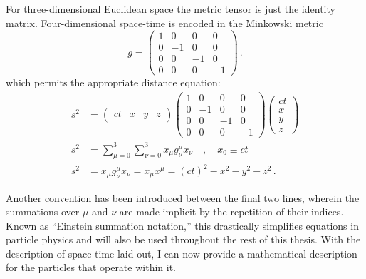     For three-dimensional Euclidean space the metric tensor is just the identity matrix.
    Four-dimensional space-time is encoded in the Minkowski metric
    \begin{equation}
        g = \begin{pmatrix}
            1 &  0 &  0 &  0 \\
            0 & -1 &  0 &  0 \\
            0 &  0 & -1 &  0 \\
            0 &  0 &  0 & -1
        \end{pmatrix}
        \,.
    \end{equation}
    which permits the appropriate distance equation:
    \begin{equation} \begin{split}
        s^2 &= \begin{pmatrix} ct & x & y & z\end{pmatrix} 
            \begin{pmatrix}
                1 &  0 &  0 &  0 \\
                0 & -1 &  0 &  0 \\
                0 &  0 & -1 &  0 \\
                0 &  0 &  0 & -1
            \end{pmatrix}
            \begin{pmatrix} ct \\ x \\ y \\ z \end{pmatrix} \\
        s^2 &= \sum\limits_{\mu=0}^3 \sum\limits_{\nu=0}^3 x_\mu g^\mu_\nu x_\nu
            \quad , \quad x_0 \equiv ct \\
        s^2 &= x_\mu g^\mu_\nu x_\nu = x_\mu x^\mu = (ct)^2-x^2-y^2-z^2
        \,.
    \end{split} \end{equation}

    Another convention has been introduced between the final two lines,
        wherein the summations over $\mu$ and $\nu$ are made implicit by the repetition of their indices.
    Known as ``Einstein summation notation,'' this drastically simplifies equations in particle physics
        and will also be used throughout the rest of this thesis.
    With the description of space-time laid out,
        I can now provide a mathematical description for the particles that operate within it.


